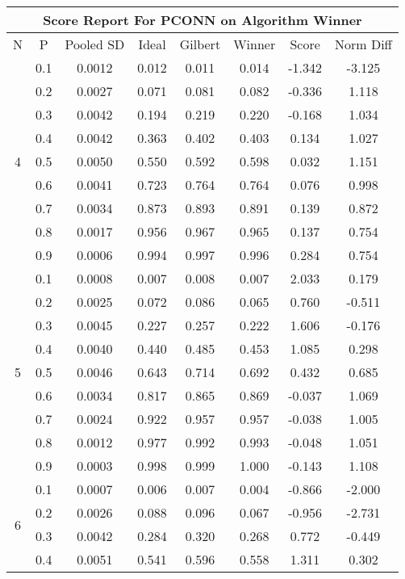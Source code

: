 \documentclass[11pt,a4paper]{report}
\begin{document}
\begin{longtable}{ | c | c || c | c | c | c | c | c | }
\hline
\multicolumn{8}{|c|}{ Score Report For PCONN on Algorithm Winner} \\
\hline
N & P & Pooled SD &  Ideal &  Gilbert & Winner  & Score & Norm Diff \\
 \hline
 \hline
 \endhead
\multirow{9}{*}{4} & 0.1 & 0.0012 & 0.012 & 0.011 & 0.014 & -1.342 & -3.125 \\
 & 0.2 & 0.0027 & 0.071 & 0.081 & 0.082 & -0.336 & 1.118 \\
 & 0.3 & 0.0042 & 0.194 & 0.219 & 0.220 & -0.168 & 1.034 \\
 & 0.4 & 0.0042 & 0.363 & 0.402 & 0.403 & 0.134 & 1.027 \\
 & 0.5 & 0.0050 & 0.550 & 0.592 & 0.598 & 0.032 & 1.151 \\
 & 0.6 & 0.0041 & 0.723 & 0.764 & 0.764 & 0.076 & 0.998 \\
 & 0.7 & 0.0034 & 0.873 & 0.893 & 0.891 & 0.139 & 0.872 \\
 & 0.8 & 0.0017 & 0.956 & 0.967 & 0.965 & 0.137 & 0.754 \\
 & 0.9 & 0.0006 & 0.994 & 0.997 & 0.996 & 0.284 & 0.754 \\
 \hline
\multirow{9}{*}{5} & 0.1 & 0.0008 & 0.007 & 0.008 & 0.007 & 2.033 & 0.179 \\
 & 0.2 & 0.0025 & 0.072 & 0.086 & 0.065 & 0.760 & -0.511 \\
 & 0.3 & 0.0045 & 0.227 & 0.257 & 0.222 & 1.606 & -0.176 \\
 & 0.4 & 0.0040 & 0.440 & 0.485 & 0.453 & 1.085 & 0.298 \\
 & 0.5 & 0.0046 & 0.643 & 0.714 & 0.692 & 0.432 & 0.685 \\
 & 0.6 & 0.0034 & 0.817 & 0.865 & 0.869 & -0.037 & 1.069 \\
 & 0.7 & 0.0024 & 0.922 & 0.957 & 0.957 & -0.038 & 1.005 \\
 & 0.8 & 0.0012 & 0.977 & 0.992 & 0.993 & -0.048 & 1.051 \\
 & 0.9 & 0.0003 & 0.998 & 0.999 & 1.000 & -0.143 & 1.108 \\
 \hline
\multirow{9}{*}{6} & 0.1 & 0.0007 & 0.006 & 0.007 & 0.004 & -0.866 & -2.000 \\
 & 0.2 & 0.0026 & 0.088 & 0.096 & 0.067 & -0.956 & -2.731 \\
 & 0.3 & 0.0042 & 0.284 & 0.320 & 0.268 & 0.772 & -0.449 \\
 & 0.4 & 0.0051 & 0.541 & 0.596 & 0.558 & 1.311 & 0.302 \\

\end{longtable}
\end{document}
